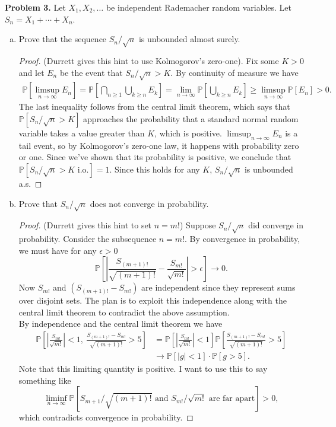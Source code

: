 \documentclass[11pt,letterpaper]{report}
\newcommand{\Prob}{\mathbb{P}}
\begin{document}
\noindent\textbf{Problem 3. }
Let $X_1, X_2, \ldots$ be independent Rademacher random variables. Let $S_n = X_1 + \cdots + X_n$.
\begin{enumerate}[(a)]
	\item Prove that the sequence $S_n/\sqrt{n}$ is unbounded almost surely.
	\begin{proof}
		(Durrett gives this hint to use Kolmogorov's zero-one). Fix some $K>0$ and let $E_n$ be the event that $S_n/\sqrt{n}>K$. By continuity of measure we have
		\begin{align*}
			\Prob[\limsup_{n\to \infty}E_n] = \Prob\left[\bigcap_{n\geq 1}\bigcup_{k\geq n}E_k\right]= \lim_{n\to \infty}\Prob\left[\bigcup_{k\geq n}E_k\right] \geq \limsup_{n\to \infty}\Prob[E_n]>0.
		\end{align*}
		The last inequality follows from the central limit theorem, which says that $\Prob[S_n/\sqrt{n}>K]$ approaches the probability that a standard normal random variable takes a value greater than $K$, which is positive. $\limsup_{n\to \infty}E_n$ is a tail event, so by Kolmogorov's zero-one law, it happens with probability zero or one. Since we've shown that its probability is positive, we conclude that $\Prob[S_n/\sqrt{n}>K\text{ i.o.}] = 1$. Since this holds for any $K$, $S_n/\sqrt{n}$ is unbounded a.s.
	\end{proof}

	\item Prove that $S_n/\sqrt{n}$ does not converge in probability.
	\begin{proof}
		(Durrett gives this hint to set $n = m!$) Suppose $S_n/\sqrt{n}$ did converge in probability. Consider the subsequence $n = m!$. By convergence in probability, we must have for any $\epsilon>0$
		\[
		\Prob\left[\left|\frac{S_{(m+1)!}}{\sqrt{(m+1)!}} - \frac{S_{m!}}{\sqrt{m!}}\right|>\epsilon\right]\to 0.
		\]
		Now $S_{m!}$ and $(S_{(m+1)!} - S_{m!})$ are independent since they represent sums over disjoint sets. The plan is to exploit this independence along with the central limit theorem to contradict the above assumption.\\

		\noindent By independence and the central limit theorem we have
		\begin{align*}
		\Prob\left[\left|\frac{S_{m!}}{\sqrt{m!}}\right|<1,\ \frac{S_{(m+1)!}-S_{m!}}{\sqrt{(m+1)!}}>5\right] &= \Prob\left[\left|\frac{S_{m!}}{\sqrt{m!}}\right|<1\right] \Prob\left[\frac{S_{(m+1)!}-S_{m!}}{\sqrt{(m+1)!}}>5\right]\\
		&\to \Prob[|g|<1]\cdot \Prob[g>5].
		\end{align*}
		Note that this limiting quantity is positive. I want to use this to say something like
		\[
		\liminf_{n\to \infty}\Prob[S_{m+1}/\sqrt{(m+1)!}\text{ and }S_{m!}/\sqrt{m!}\text{ are far apart}]>0,
		\]
		which contradicts convergence in probability.
	\end{proof}
\end{enumerate}
\end{document}
